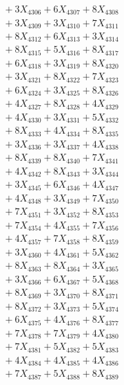 \documentclass[a4paper,10pt]{article}
\begin{document}
{\begin{align}
&\;  + 3 X_{4306} + 6 X_{4307} + 8 X_{4308} \\[0.3ex]
&\;  + 3 X_{4309} + 3 X_{4310} + 7 X_{4311} \\[0.3ex]
&\;  + 8 X_{4312} + 6 X_{4313} + 3 X_{4314} \\[0.3ex]
&\;  + 8 X_{4315} + 5 X_{4316} + 8 X_{4317} \\[0.3ex]
&\;  + 6 X_{4318} + 3 X_{4319} + 8 X_{4320} \\[0.3ex]
&\;  + 3 X_{4321} + 8 X_{4322} + 7 X_{4323} \\[0.3ex]
&\;  + 6 X_{4324} + 3 X_{4325} + 8 X_{4326} \\[0.3ex]
&\;  + 4 X_{4327} + 8 X_{4328} + 4 X_{4329} \\[0.5ex]\allowbreak
&\;  + 4 X_{4330} + 3 X_{4331} + 5 X_{4332} \\[0.3ex]
&\;  + 8 X_{4333} + 4 X_{4334} + 8 X_{4335} \\[0.3ex]
&\;  + 3 X_{4336} + 3 X_{4337} + 4 X_{4338} \\[0.3ex]
&\;  + 8 X_{4339} + 8 X_{4340} + 7 X_{4341} \\[0.3ex]
&\;  + 4 X_{4342} + 8 X_{4343} + 3 X_{4344} \\[0.3ex]
&\;  + 3 X_{4345} + 6 X_{4346} + 4 X_{4347} \\[0.3ex]
&\;  + 4 X_{4348} + 3 X_{4349} + 7 X_{4350} \\[0.3ex]
&\;  + 7 X_{4351} + 3 X_{4352} + 8 X_{4353} \\[0.3ex]
&\;  + 7 X_{4354} + 4 X_{4355} + 7 X_{4356} \\[0.3ex]
&\;  + 4 X_{4357} + 7 X_{4358} + 8 X_{4359} \\[0.5ex]\allowbreak
&\;  + 3 X_{4360} + 4 X_{4361} + 5 X_{4362} \\[0.3ex]
&\;  + 8 X_{4363} + 8 X_{4364} + 3 X_{4365} \\[0.3ex]
&\;  + 3 X_{4366} + 6 X_{4367} + 5 X_{4368} \\[0.3ex]
&\;  + 8 X_{4369} + 3 X_{4370} + 8 X_{4371} \\[0.3ex]
&\;  + 8 X_{4372} + 3 X_{4373} + 5 X_{4374} \\[0.3ex]
&\;  + 6 X_{4375} + 4 X_{4376} + 8 X_{4377} \\[0.3ex]
&\;  + 7 X_{4378} + 7 X_{4379} + 4 X_{4380} \\[0.3ex]
&\;  + 7 X_{4381} + 5 X_{4382} + 5 X_{4383} \\[0.3ex]
&\;  + 4 X_{4384} + 4 X_{4385} + 4 X_{4386} \\[0.3ex]
&\;  + 7 X_{4387} + 5 X_{4388} + 8 X_{4389} \\[0.5ex]\allowbreak

\end{align}}
\end{document}
